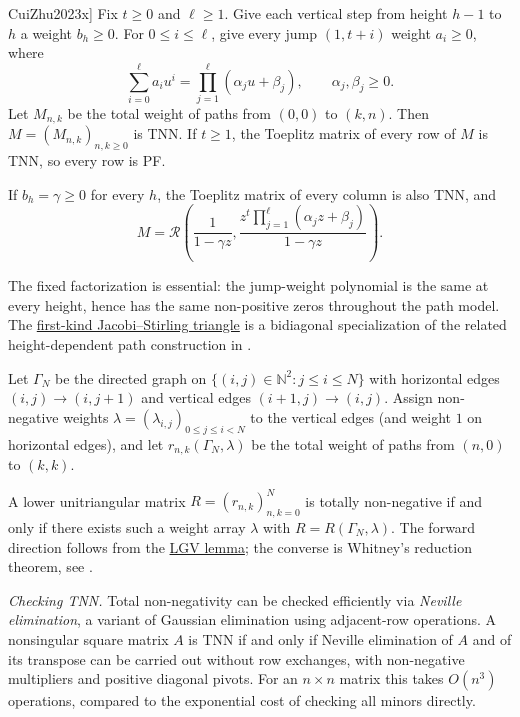 \begin{theorem}[Cui--Zhu, \cite[Thm.~1.7]{CuiZhu2023x}]
\label{cuiZhuWeightedPaths}
Fix \(t\geq 0\) and \(\ell\geq 1\).  Give each vertical step from height
\(h-1\) to \(h\) a weight \(b_h\geq 0\).  For \(0\leq i\leq\ell\), give
every jump \((1,t+i)\) weight \(a_i\geq 0\), where
\[
 \sum_{i=0}^{\ell}a_i u^i
 =\prod_{j=1}^{\ell}(\alpha_j u+\beta_j),
 \qquad \alpha_j,\beta_j\geq 0.
\]
Let \(M_{n,k}\) be the total weight of paths from \((0,0)\) to \((k,n)\).
Then \(M=(M_{n,k})_{n,k\geq 0}\) is TNN.  If \(t\geq 1\), the Toeplitz
matrix of every row of \(M\) is TNN, so every row is PF.

If \(b_h=\gamma\geq 0\) for every \(h\), the Toeplitz matrix of every column
is also TNN, and
\[
 M=\mathcal R\left(
   \frac{1}{1-\gamma z},
   \frac{z^t\prod_{j=1}^{\ell}(\alpha_jz+\beta_j)}{1-\gamma z}
 \right).
\]
\end{theorem}

The fixed factorization is essential: the jump-weight polynomial is the same
at every height, hence has the same non-positive zeros throughout the path
model.  The \hyperref[jacobiStirlingSpecializations]{first-kind
Jacobi--Stirling triangle} is a bidiagonal specialization of the related
height-dependent path construction in \cite[Sec.~7.6]{CuiZhu2023x}.

\begin{theorem}
\label{tnnLowerUnitriangularMatrix}
Let \(\Gamma_N\) be the directed graph on
\(\{(i,j)\in\mathbb{N}^2 : j \leq i \leq N\}\) with horizontal edges
\((i,j)\to(i,j+1)\) and vertical edges \((i+1,j)\to(i,j)\).  Assign
non-negative weights
\(\lambda=(\lambda_{i,j})_{0\leq j\leq i<N}\) to the vertical edges
(and weight \(1\) on horizontal edges), and let
\(r_{n,k}(\Gamma_N,\lambda)\) be the total weight of paths from \((n,0)\)
to \((k,k)\).

A lower unitriangular matrix \(R=(r_{n,k})_{n,k=0}^N\) is totally
non-negative if and only if there exists such a weight array \(\lambda\) with
\(R=R(\Gamma_N,\lambda)\).  The forward direction follows from the
\hyperref[lgvLemma]{LGV lemma}; the converse is Whitney's reduction theorem,
see \cite{FallatJohnson2011}.
\end{theorem}

\emph{Checking TNN.}
Total non-negativity can be checked efficiently via \emph{Neville
elimination}, a variant of Gaussian elimination using adjacent-row
operations.  A nonsingular square matrix \(A\) is TNN if and only if
Neville elimination of \(A\) and of its transpose can be carried out
without row exchanges, with non-negative
multipliers and positive diagonal pivots.  For an \(n\times n\) matrix this
takes \(O(n^3)\) operations, compared to the exponential cost of checking all
minors directly.

